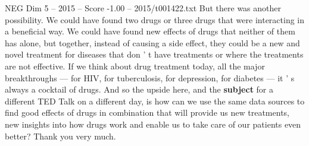 \begin{textsample}{NEG Dim 5 – 2015 – Score -1.00 – 2015/t001422.txt}
But there was another possibility.
We could have found two drugs or three drugs that were interacting in a beneficial way.
We could have found new effects of drugs that neither of them has alone, but together, instead of causing a side effect, they could be a new and novel treatment for diseases that don ' t have treatments or where the treatments are not effective.
If we think about drug treatment today, all the major breakthroughs — for HIV, for tuberculosis, for depression, for diabetes — it ' s always a cocktail of drugs.
And so the upside here, and the \textbf{subject} for a different TED Talk on a different day, is how can we use the same data sources to find good effects of drugs in combination that will provide us new treatments, new insights into how drugs work and enable us to take care of our patients even better?
Thank you very much.

\end{textsample}
